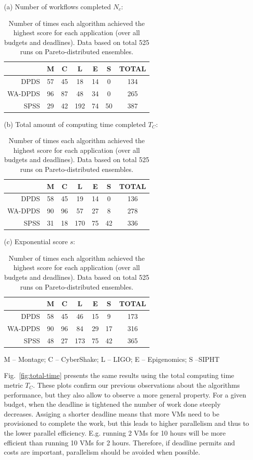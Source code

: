 \documentclass{sig-alternate}
\begin{document}
\begin{table}[tb]
\centering

(a) Number of workflows completed $N_c$:
\medskip
\begin{tabular}{r|cccccc}
 & M & C & L & E & S & TOTAL\tabularnewline
\hline
DPDS      &   57  & 45 &  18 &  14  &  0 & 134\tabularnewline
WA-DPDS   &    96 &  87  & 48  & 34  &  0 & 265\tabularnewline
SPSS     &    29  & 42  & 192  & 74  & 50 & 387\tabularnewline
\end{tabular}
\medskip

(b) Total amount of computing time completed $T_C$:
\medskip
\begin{tabular}{r|cccccc}
 & M & C & L & E & S & TOTAL\tabularnewline
\hline
DPDS      &   58  & 45 &  19 &  14  &  0 & 136\tabularnewline
WA-DPDS   &    90  & 96  & 57  & 27 &   8 & 278\tabularnewline
SPSS     &    31 &  18 &  170  & 75 &  42 & 336\tabularnewline
\end{tabular}
\medskip

(c) Exponential score $s$:
\medskip
\begin{tabular}{r|cccccc}
 & M & C & L & E & S & TOTAL\tabularnewline
\hline
DPDS      &   58 &  45 &  46 &  15  &  9 & 173\tabularnewline
WA-DPDS   &    90 &  96  & 84  & 29 &  17 & 316\tabularnewline
SPSS     &    48 &  27 & 173 &  75 &  42 & 365\tabularnewline
\end{tabular}
\medskip


M -- Montage; C -- CyberShake; L -- LIGO; E -- Epigenomics; S --SIPHT

\label{tab:num-dags-pareto}
\caption{Number of times each algorithm achieved the highest score for each
application (over all budgets and deadlines). Data based on total 525 runs on Pareto-distributed ensembles.}
\end{table}


Fig.~\ref{fig:total-time} presents the same results using the total computing
time metric $T_C$. These plots confirm our previous observations about the
algorithms performance, but they also allow to observe a more general property.
For a given budget, when the deadline is tightened the number of work done
steeply decreases. Assiging a shorter deadline means that more VMs need to be
provisioned to complete the work, but this leads to higher parallelism and thus
to the lower parallel efficiency. E.g. running 2 VMs for 10 hours will be more
efficient than running 10 VMs for 2 hours. Therefore, if deadline permits and
costs are important, parallelism should be avoided when possible.
\end{document}
